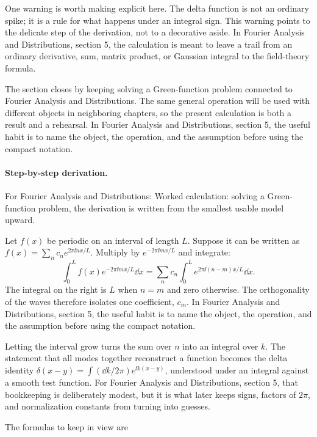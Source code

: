 One warning is worth making explicit here.  The delta function is not an ordinary spike; it is a rule for what happens under an integral sign.  This warning points to the delicate step of the derivation, not to a decorative aside.  In Fourier Analysis and Distributions, section 5, the calculation is meant to leave a trail from an ordinary derivative, sum, matrix product, or Gaussian integral to the field-theory formula.

The section closes by keeping solving a Green-function problem connected to Fourier Analysis and Distributions.  The same general operation will be used with different objects in neighboring chapters, so the present calculation is both a result and a rehearsal.  In Fourier Analysis and Distributions, section 5, the useful habit is to name the object, the operation, and the assumption before using the compact notation.



\paragraph{Step-by-step derivation.}

For Fourier Analysis and Distributions: Worked calculation: solving a Green-function problem, the derivation is written from the smallest usable model upward.

Let \(f(x)\) be periodic on an interval of length \(L\).  Suppose it can be written as \(f(x)=\sum_n c_ne^{2\pi\ii nx/L}\).  Multiply by \(e^{-2\pi\ii mx/L}\) and integrate:
\[
  \int_0^L f(x)e^{-2\pi\ii mx/L}\dd x
  =
  \sum_n c_n\int_0^L e^{2\pi\ii(n-m)x/L}\dd x.
\]
The integral on the right is \(L\) when \(n=m\) and zero otherwise.  The orthogonality of the waves therefore isolates one coefficient, \(c_m\).  In Fourier Analysis and Distributions, section 5, the useful habit is to name the object, the operation, and the assumption before using the compact notation.

Letting the interval grow turns the sum over \(n\) into an integral over \(k\).  The statement that all modes together reconstruct a function becomes the delta identity \(\delta(x-y)=\int(\dd k/2\pi)e^{\ii k(x-y)}\), understood under an integral against a smooth test function.  For Fourier Analysis and Distributions, section 5, that bookkeeping is deliberately modest, but it is what later keeps signs, factors of \(2\pi\), and normalization constants from turning into guesses.

The formulas to keep in view are

